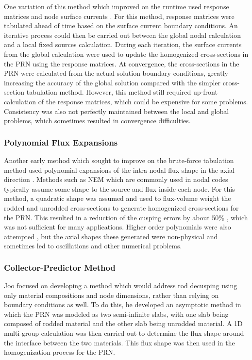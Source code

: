 One variation of this method which improved on the runtime used response matrices and node surface currents \cite{chengThesis1981homogenizationResponseMatrix,finckThesis1982homogenizationResponseMatrix}.  For this method, response matrices were tabulated ahead of time based on the surface current boundary conditions.  An iterative process could then be carried out between the global nodal calculation and a local fixed sources calculation.  During each iteration, the surface currents from the global calculation were used to update the homogenized cross-sections in the PRN using the response matrices.  At convergence, the cross-sections in the PRN were calculated from the actual solution boundary conditions, greatly increasing the accuracy of the global solution compared with the simpler cross-section tabulation method.  However, this method still required up-front calculation of the response matrices, which could be expensive for some problems.  Consistency was also not perfectly maintained between the local and global problems, which sometimes resulted in convergence difficulties.

\subsubsection{Polynomial Flux Expansions}

Another early method which sought to improve on the brute-force tabulation method used polynomial expansions of the intra-nodal flux shape in the axial direction \cite{bennewitz1975higher,finnemann1981space}.  Methods such as NEM which are commonly used in nodal codes typically assume some shape to the source and flux inside each node.  For this method, a quadratic shape was assumed and used to flux-volume weight the rodded and unrodded cross-sections to generate homogenized cross-sections for the PRN.  This resulted in a reduction of the cusping errors by about 50\% \cite{KordSmithMastersThesis1979AnalyticNodalMethod}, which was not sufficient for many applications.  Higher order polynomials were also attempted \cite{langenbuch1977coarse}, but the axial shapes these generated were non-physical and sometimes led to oscillations and other numerical problems.

\subsubsection{Collector-Predictor Method}

Joo \cite{HanSemJooThesis1984} focused on developing a method which would address rod decusping using only material compositions and node dimensions, rather than relying on boundary conditions as well.  To do this, he developed an asymptotic method in which the PRN was modeled as two semi-infinite slabs, with one slab being composed of rodded material and the other slab being unrodded material.  A 1D multi-group calculation was then carried out to determine the flux shape around the interface between the two materials.  This flux shape was then used in the homogenization process for the PRN.

